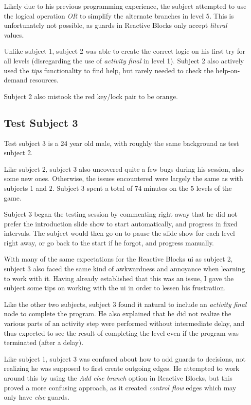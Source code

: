 \noindent
Likely due to his previous programming experience, the subject attempted to use the logical operation \emph{OR} to simplify the alternate branches in level 5. This is unfortunately not possible, as guards in Reactive Blocks only accept \emph{literal} values.

\noindent
Unlike subject 1, subject 2 was able to create the correct logic on his first try for all levels (disregarding the use of \emph{activity final} in level 1). Subject 2 also actively used the \emph{tips} functionality to find help, but rarely needed to check the help-on-demand resources.

\noindent
Subject 2 also mistook the red key/lock pair to be orange.

\subsection{Test Subject 3}
\label{sec:game_testing_subject3}
Test subject 3 is a 24 year old male, with roughly the same background as test subject 2.

\noindent
Like subject 2, subject 3 also uncovered quite a few bugs during his session, also some new ones. Otherwise, the issues encountered were largely the same as with subjects 1 and 2. Subject 3 spent a total of 74 minutes on the 5 levels of the game.

\noindent
Subject 3 began the testing session by commenting right away that he did not prefer the introduction slide show to start automatically, and progress in fixed intervals. The subject would then go on to pause the slide show for each level right away, or go back to the start if he forgot, and progress manually.

\noindent
With many of the same expectations for the Reactive Blocks \gls{ui} as subject 2, subject 3 also faced the same kind of awkwardness and annoyance when learning to work with it. Having already established that this was an issue, I gave the subject some tips on working with the \gls{ui} in order to lessen his frustration.

\noindent
Like the other two subjects, subject 3 found it natural to include an \emph{activity final} node to complete the program. He also explained that he did not realize the various parts of an activity step were performed without intermediate delay, and thus expected to see the result of completing the level even if the program was terminated (after a delay).

\noindent
Like subject 1, subject 3 was confused about how to add guards to decisions, not realizing he was supposed to first create outgoing edges. He attempted to work around this by using the \emph{Add else branch} option in Reactive Blocks, but this proved a more confusing approach, as it created \emph{control flow} edges which may only have \emph{else} guards.

